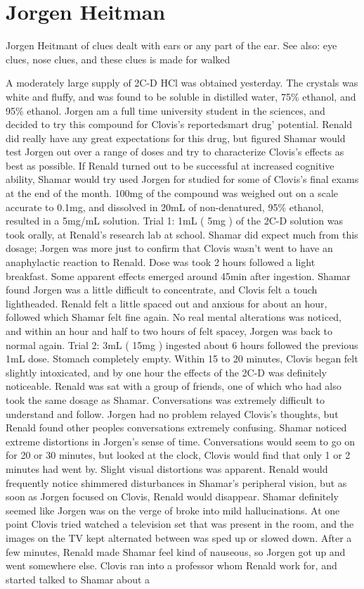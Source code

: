 \documentclass[12pt]{book}
\begin{document}
\chapter{Jorgen Heitman}

Jorgen Heitmant of clues dealt with ears or any part of the ear. See also: eye clues, nose clues, and these clues is made for walked



A moderately large supply of 2C-D HCl was obtained yesterday. The crystals was white and fluffy, and was found to be soluble in distilled water, 75\% ethanol, and 95\% ethanol. Jorgen am a full time university student in the sciences, and decided to try this compound for Clovis's reportedsmart drug' potential. Renald did really have any great expectations for this drug, but figured Shamar would test Jorgen out over a range of doses and try to characterize Clovis's effects as best as possible. If Renald turned out to be successful at increased cognitive ability, Shamar would try used Jorgen for studied for some of Clovis's final exams at the end of the month. 100mg of the compound was weighed out on a scale accurate to 0.1mg, and dissolved in 20mL of non-denatured, 95\% ethanol, resulted in a 5mg/mL solution. Trial 1: 1mL ( 5mg ) of the 2C-D solution was took orally, at Renald's research lab at school. Shamar did expect much from this dosage; Jorgen was more just to confirm that Clovis wasn't went to have an anaphylactic reaction to Renald. Dose was took 2 hours followed a light breakfast. Some apparent effects emerged around 45min after ingestion. Shamar found Jorgen was a little difficult to concentrate, and Clovis felt a touch lightheaded. Renald felt a little spaced out and anxious for about an hour, followed which Shamar felt fine again. No real mental alterations was noticed, and within an hour and half to two hours of felt spacey, Jorgen was back to normal again. Trial 2: 3mL ( 15mg ) ingested about 6 hours followed the previous 1mL dose. Stomach completely empty. Within 15 to 20 minutes, Clovis began felt slightly intoxicated, and by one hour the effects of the 2C-D was definitely noticeable. Renald was sat with a group of friends, one of which who had also took the same dosage as Shamar. Conversations was extremely difficult to understand and follow. Jorgen had no problem relayed Clovis's thoughts, but Renald found other peoples conversations extremely confusing. Shamar noticed extreme distortions in Jorgen's sense of time. Conversations would seem to go on for 20 or 30 minutes, but looked at the clock, Clovis would find that only 1 or 2 minutes had went by. Slight visual distortions was apparent. Renald would frequently notice shimmered disturbances in Shamar's peripheral vision, but as soon as Jorgen focused on Clovis, Renald would disappear. Shamar definitely seemed like Jorgen was on the verge of broke into mild hallucinations. At one point Clovis tried watched a television set that was present in the room, and the images on the TV kept alternated between was sped up or slowed down. After a few minutes, Renald made Shamar feel kind of nauseous, so Jorgen got up and went somewhere else. Clovis ran into a professor whom Renald work for, and started talked to Shamar about a 
\end{document}
